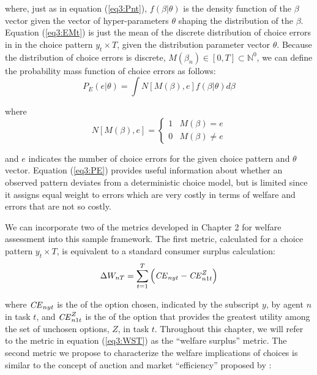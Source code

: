 \documentclass[../main.tex]{subfiles}
\begin{document}
\noindent where, just as in equation (\ref{eq3:Pnt}), $f(\beta|\theta)$ is the density function of the $\beta$ vector given the vector of hyper-parameters $\theta$ shaping the distribution of the $\beta$.
Equation (\ref{eq3:EMt}) is just the mean of the discrete distribution of choice errors in in the choice pattern $y_t \times T$, given the distribution parameter vector $\theta$.
Because the distribution of choice errors is discrete, $M(\beta_n) \in [0,T] \subset \mathbb{N}^0$, we can define the probability mass function of choice errors as follows{\footnotemark}:
\begin{equation}
	\label{eq3:PE}
	P_E(e | \theta) = \int N[M(\beta),e] f(\beta|\theta) d \beta
\end{equation}

\addtocounter{footnote}{-1}

\noindent where
\begin{equation}
	\label{eq3:NMB}
	N[M(\beta), e] = 
	\begin{cases}
		1 & M(\beta) = e\\
		0 & M(\beta) \neq e
	\end{cases}
\end{equation}

\noindent and $e$ indicates the number of choice errors for the given choice pattern and $\theta$ vector.
Equation (\ref{eq3:PE}) provides useful information about whether an observed pattern deviates from a deterministic choice model, but is limited since it assigns equal weight to errors which are very costly in terms of welfare and errors that are not so costly.

We can incorporate two of the metrics developed in Chapter 2 for welfare assessment into this sample framework.
The first metric, calculated for a choice pattern $y_t \times T$, is equivalent to a standard consumer surplus calculation:
\begin{equation}
	\label{eq3:WST}
	\Delta W_{nT} = \sum_{t=1}^T \left( {\mathit{CE}}_{nyt} - {\mathit{CE}}_{n1t}^Z \right)
\end{equation}

\noindent where ${\mathit{CE}}_{nyt}$ is the {\CE} of the option chosen, indicated by the subscript $y$, by agent $n$ in task $t$, and ${\mathit{CE}}_{n1t}^Z$ is the {\CE} of the option that provides the greatest utility among the set of unchosen options, $Z$, in task $t$.
Throughout this chapter, we will refer to the metric in equation (\ref{eq3:WST}) as the \enquote{welfare surplus} metric.
The second metric we propose to characterize the welfare implications of choices is similar to the concept of auction and market \enquote{efficiency} proposed by \textcite{Plott1978}:
\end{document}
